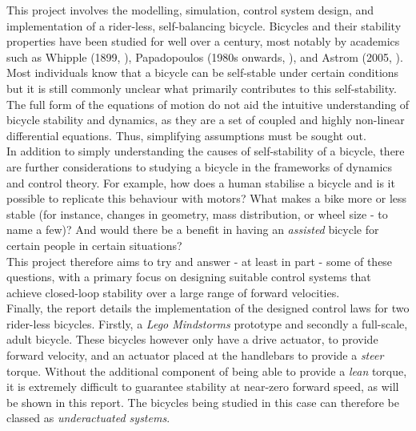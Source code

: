 This project involves the modelling, simulation, control system design, and implementation of a rider-less, self-balancing bicycle. Bicycles and their stability properties have been studied for well over a century, most notably by academics such as Whipple (1899, \cite{whipple}), Papadopoulos (1980s onwards, \cite{papadopoulos}), and Astrom (2005, \cite{astrom}). Most individuals know that a bicycle can be self-stable under certain conditions but it is still commonly unclear what primarily contributes to this self-stability. The full form of the equations of motion do not aid the intuitive understanding of bicycle stability and dynamics, as they are a set of coupled and highly non-linear differential equations. Thus, simplifying assumptions must be sought out. \\

\noindent In addition to simply understanding the causes of self-stability of a bicycle, there are further considerations to studying a bicycle in the frameworks of dynamics and control theory. For example, how does a human stabilise a bicycle and is it possible to replicate this behaviour with motors? What makes a bike more or less stable (for instance, changes in geometry, mass distribution, or wheel size - to name a few)? And would there be a benefit in having an \textit{assisted} bicycle for certain people in certain situations? \\

\noindent This project therefore aims to try and answer - at least in part - some of these questions, with a primary focus on designing suitable control systems that achieve closed-loop stability over a large range of forward velocities. \\

Finally, the report details the implementation of the designed control laws for two rider-less bicycles. Firstly, a \textit{Lego Mindstorms} prototype and secondly a full-scale, adult bicycle. These bicycles however only have a drive actuator, to provide forward velocity, and an actuator placed at the handlebars to provide a \textit{steer} torque. Without the additional component of being able to provide a \textit{lean} torque, it is extremely difficult to guarantee stability at near-zero forward speed, as will be shown in this report. The bicycles being studied in this case can therefore be classed as \textit{underactuated systems}.